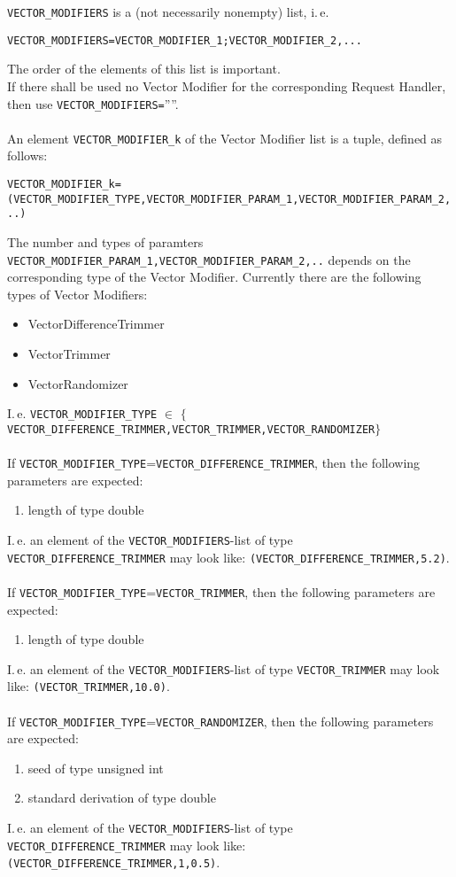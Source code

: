 \texttt{VECTOR\_MODIFIERS} is a (not necessarily nonempty) list, i.\,e. 
\begin{center}\scriptsize
	\texttt{VECTOR\_MODIFIERS=VECTOR\_MODIFIER\_1;VECTOR\_MODIFIER\_2,...}
\end{center}
The order of the elements of this list is important.\\
If there shall be used no Vector Modifier for the corresponding Request Handler, then use \texttt{VECTOR\_MODIFIERS=}''''.\\
\\
An element \texttt{VECTOR\_MODIFIER\_k} of the Vector Modifier list is a tuple, defined as follows:
\begin{center}\scriptsize
\texttt{VECTOR\_MODIFIER\_k=(VECTOR\_MODIFIER\_TYPE,VECTOR\_MODIFIER\_PARAM\_1,VECTOR\_MODIFIER\_PARAM\_2,..)}\\
\end{center}
The number and types of paramters \texttt{VECTOR\_MODIFIER\_PARAM\_1,VECTOR\_MODIFIER\_PARAM\_2,..} depends on the corresponding type of the Vector Modifier. Currently there are the following types of Vector Modifiers:
\begin{itemize}
	\item VectorDifferenceTrimmer
	\item VectorTrimmer
	\item VectorRandomizer
\end{itemize}
I.\,e. \texttt{VECTOR\_MODIFIER\_TYPE} $\in$ $\{$\texttt{VECTOR\_DIFFERENCE\_TRIMMER,VECTOR\_TRIMMER,VECTOR\_RANDOMIZER}$\}$\\
\\
If \texttt{VECTOR\_MODIFIER\_TYPE}=\texttt{VECTOR\_DIFFERENCE\_TRIMMER}, then the following parameters are expected:
\begin{enumerate}
	\item length of type double
\end{enumerate}
I.\,e. an element of the \texttt{VECTOR\_MODIFIERS}-list of type \texttt{VECTOR\_DIFFERENCE\_TRIMMER} may look like: \texttt{(VECTOR\_DIFFERENCE\_TRIMMER,5.2)}.\\
\\
If \texttt{VECTOR\_MODIFIER\_TYPE}=\texttt{VECTOR\_TRIMMER}, then the following parameters are expected:
\begin{enumerate}
	\item length of type double
\end{enumerate}
I.\,e. an element of the \texttt{VECTOR\_MODIFIERS}-list of type \texttt{VECTOR\_TRIMMER} may look like: \texttt{(VECTOR\_TRIMMER,10.0)}.\\
\\
If \texttt{VECTOR\_MODIFIER\_TYPE}=\texttt{VECTOR\_RANDOMIZER}, then the following parameters are expected:
\begin{enumerate}
	\item seed of type unsigned int
	\item standard derivation of type double
\end{enumerate}
I.\,e. an element of the \texttt{VECTOR\_MODIFIERS}-list of type \texttt{VECTOR\_DIFFERENCE\_TRIMMER} may look like: \texttt{(VECTOR\_DIFFERENCE\_TRIMMER,1,0.5)}.\\

